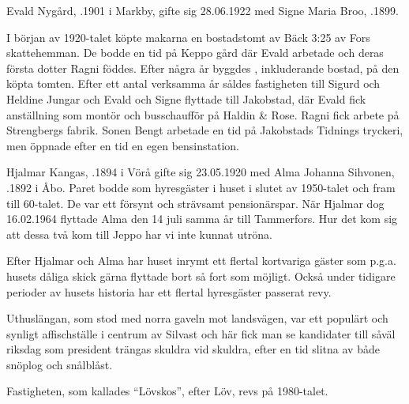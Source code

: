 Evald Nygård, .1901 i Markby, gifte sig 28.06.1922 med Signe Maria Broo, .1899.

I början av 1920-talet köpte makarna en bostadstomt av Bäck 3:25 av Fors skattehemman. De bodde en tid på Keppo gård där Evald arbetade och deras första dotter Ragni föddes. Efter några år byggdes , inkluderande bostad, på den köpta tomten. Efter ett antal verksamma år såldes fastigheten till Sigurd och Heldine Jungar och Evald och Signe flyttade till Jakobstad, där Evald fick anställning som montör och busschaufför på Haldin \& Rose. Ragni fick arbete på Strengbergs fabrik. Sonen Bengt arbetade en tid på Jakobstads Tidnings tryckeri, men öppnade efter en tid en egen bensinstation.
\begin{jhchildren}
  \item {}
  \item {}
\end{jhchildren}





Hjalmar Kangas, .1894 i Vörå gifte sig 23.05.1920 med Alma Johanna Sihvonen, .1892 i Åbo. Paret bodde som hyresgäster i huset i slutet av 1950-talet och fram till 60-talet. De var ett försynt och strävsamt pensionärspar. När Hjalmar dog 16.02.1964 flyttade Alma den 14 juli samma år till Tammerfors. Hur det kom sig att dessa två kom till Jeppo har vi inte kunnat utröna.

Efter Hjalmar och Alma har huset inrymt ett flertal kortvariga gäster som p.g.a. husets dåliga skick gärna flyttade bort så fort som möjligt. Också under tidigare perioder av husets historia har ett flertal hyresgäster passerat revy.

Uthuslängan, som stod med norra gaveln mot landsvägen, var ett populärt och synligt affischställe i centrum av Silvast och här fick man se kandidater till såväl riksdag som president trängas skuldra vid skuldra, efter en tid slitna av både snöplog och snålblåst.

Fastigheten, som kallades ``Lövskos'', efter Löv, revs på 1980-talet.


